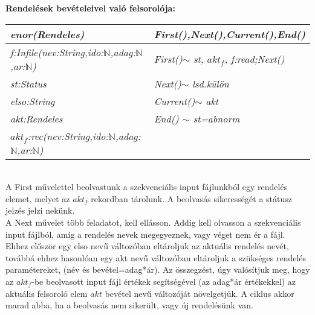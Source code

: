 \documentclass[12pt,a4paper]{article}			%
\begin{document}
	\noindent\hfill
		\begin{stuki}[12cm]
			\begin{WHILE}{4}{}
				\begin{IF}[70]{2}{}
				\ELSE
				\end{IF}
			\end{WHILE}
		\end{stuki}
		\vspace{5mm}
	\textbf{Rendelések bevételeivel való felsorolója:}
	\vspace{5mm}\\
		\begin{tabular}{|l|l|}
			\hline
			\textit{enor(Rendeles)}& \textit{First(),Next(),Current(),End()}\\
			\hline
			\textit{f:Infile(nev:String,ido:$\mathbb{N}$,adag:$\mathbb{N}$,ar:$\mathbb{N}$) }& \textit{First()$\sim$ st, $akt_f$, f:read;Next()}\\
			\textit{st:Status} & \textit{Next()$\sim$ lsd.külön}\\
			\textit{elso:String} & \textit{Current()$\sim$ akt}\\
			\textit{akt:Rendeles} & \textit{End() $\sim$ st=abnorm}\\
			\textit{$akt_f$:rec(nev:String,ido:$\mathbb{N}$,adag:$\mathbb{N}$,ar:$\mathbb{N}$)} & \\
			\hline
		\end{tabular}
	\vspace{5mm}\\
	\indent A First művelettel beolvastunk a szekvenciális input fájlunkból egy rendelés elemet, melyet az $akt_f$ rekordban tárolunk. A beolvasás sikerességét a státusz jelzés jelzi nekünk. \\
	\indent A Next művelet több feladatot, kell ellásson. Addig kell olvasson a szekvenciális input fájlból, amíg a rendelés nevek megegyeznek, vagy véget nem ér a fájl. Ehhez először egy elso nevű változóban eltároljuk az aktuális rendelés nevét, továbbá ehhez hasonlóan egy akt nevű változóban eltároljuk a szükséges rendelés paramétereket, (név és bevétel=adag*ár). Az összegzést, úgy valósítjuk meg, hogy az $akt_f$-be beolvasott input fájl értékek segítségével (az adag*ár értékekkel) az aktuális felsoroló elem $akt$ bevétel nevű változóját növelgetjük. A ciklus akkor marad abba, ha a beolvasás nem sikerült, vagy új rendelésünk van.
\end{document}
